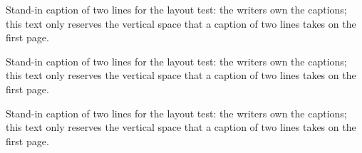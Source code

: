 \documentclass[11pt]{article}
\begin{document}
\clearpage{}\begin{simbreaktable}\caption{Stand-in caption of two lines for the layout test: the writers own the captions; this text only reserves the vertical space that a caption of two lines takes on the first page.}\end{simbreaktable}\par{}\clearpage{}
\clearpage{}\begin{simbreaktable}\caption{Stand-in caption of two lines for the layout test: the writers own the captions; this text only reserves the vertical space that a caption of two lines takes on the first page.}\end{simbreaktable}\par{}\clearpage{}
\clearpage{}\begin{simbreaktable}\caption{Stand-in caption of two lines for the layout test: the writers own the captions; this text only reserves the vertical space that a caption of two lines takes on the first page.}\end{simbreaktable}\par{}\clearpage{}
\end{document}
